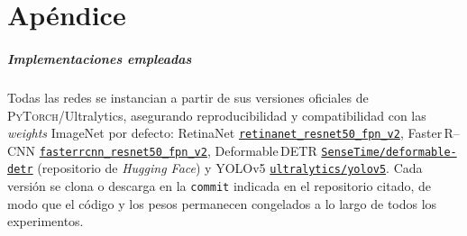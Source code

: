 \chapter{Apéndice}
\label{ch:materiales-metodos}

\paragraph{Implementaciones empleadas}
Todas las redes se instancian a partir de sus versiones oficiales de \textsc{PyTorch}/Ultralytics, asegurando reproducibilidad y compatibilidad con las \textit{weights} ImageNet por defecto:
RetinaNet \href{https://pytorch.org/vision/main/models/generated/torchvision.models.detection.retinanet_resnet50_fpn_v2.html}{\texttt{retinanet\_resnet50\_fpn\_v2}},
Faster\,R--CNN \href{https://pytorch.org/vision/main/models/generated/torchvision.models.detection.fasterrcnn_resnet50_fpn_v2.html}{\texttt{fasterrcnn\_resnet50\_fpn\_v2}},
Deformable\,DETR \href{https://huggingface.co/SenseTime/deformable-detr}{\texttt{SenseTime/deformable-detr}} (repositorio de \textit{Hugging Face})
y YOLOv5 \href{https://github.com/ultralytics/yolov5}{\texttt{ultralytics/yolov5}}.
Cada versión se clona o descarga en la \texttt{commit} indicada en el repositorio citado, de modo que el código y los pesos permanecen congelados a lo largo de todos los experimentos.
